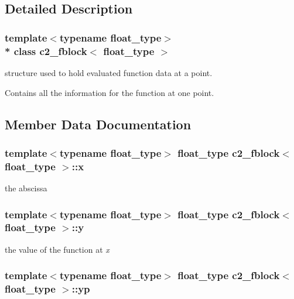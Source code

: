 \subsection{Detailed Description}
\subsubsection*{template$<$typename float\+\_\+type$>$\\*
class c2\+\_\+fblock$<$ float\+\_\+type $>$}

structure used to hold evaluated function data at a point. 

Contains all the information for the function at one point. 

\subsection{Member Data Documentation}
\subsubsection[{\texorpdfstring{x}{x}}]{\setlength{\rightskip}{0pt plus 5cm}template$<$typename float\+\_\+type$>$ float\+\_\+type {\bf c2\+\_\+fblock}$<$ float\+\_\+type $>$\+::x}\hypertarget{classc2__fblock_ad5560516bfc794724226af6d3678d518}{}\label{classc2__fblock_ad5560516bfc794724226af6d3678d518}


the abscissa 

\subsubsection[{\texorpdfstring{y}{y}}]{\setlength{\rightskip}{0pt plus 5cm}template$<$typename float\+\_\+type$>$ float\+\_\+type {\bf c2\+\_\+fblock}$<$ float\+\_\+type $>$\+::y}\hypertarget{classc2__fblock_a0de289aaf1b624af8cb1461164ea0dfd}{}\label{classc2__fblock_a0de289aaf1b624af8cb1461164ea0dfd}


the value of the function at {\itshape x} 

\subsubsection[{\texorpdfstring{yp}{yp}}]{\setlength{\rightskip}{0pt plus 5cm}template$<$typename float\+\_\+type$>$ float\+\_\+type {\bf c2\+\_\+fblock}$<$ float\+\_\+type $>$\+::yp}\hypertarget{classc2__fblock_a4df4413818bad95cd88e33d29fa7334e}{}\label{classc2__fblock_a4df4413818bad95cd88e33d29fa7334e}


